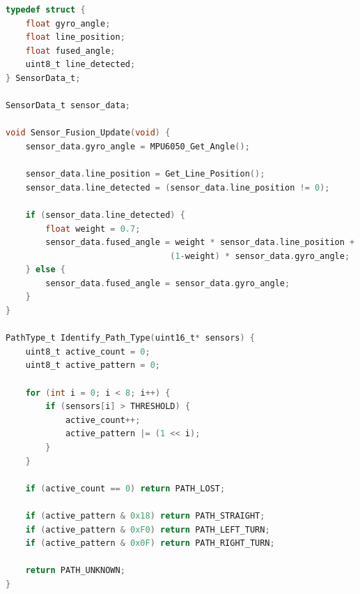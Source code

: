 \documentclass[UTF8]{ctexart}
\begin{document}
\begin{lstlisting}[language=C, caption={多传感器融合算法}, label={lst:sensor_fusion}]
typedef struct {
    float gyro_angle;
    float line_position;
    float fused_angle;
    uint8_t line_detected;
} SensorData_t;

SensorData_t sensor_data;

void Sensor_Fusion_Update(void) {
    sensor_data.gyro_angle = MPU6050_Get_Angle();
    
    sensor_data.line_position = Get_Line_Position();
    sensor_data.line_detected = (sensor_data.line_position != 0);
    
    if (sensor_data.line_detected) {
        float weight = 0.7;
        sensor_data.fused_angle = weight * sensor_data.line_position + 
                                 (1-weight) * sensor_data.gyro_angle;
    } else {
        sensor_data.fused_angle = sensor_data.gyro_angle;
    }
}

PathType_t Identify_Path_Type(uint16_t* sensors) {
    uint8_t active_count = 0;
    uint8_t active_pattern = 0;
    
    for (int i = 0; i < 8; i++) {
        if (sensors[i] > THRESHOLD) {
            active_count++;
            active_pattern |= (1 << i);
        }
    }
    
    if (active_count == 0) return PATH_LOST;
    
    if (active_pattern & 0x18) return PATH_STRAIGHT;
    if (active_pattern & 0xF0) return PATH_LEFT_TURN;
    if (active_pattern & 0x0F) return PATH_RIGHT_TURN;
    
    return PATH_UNKNOWN;
}
\end{lstlisting}
\end{document}

